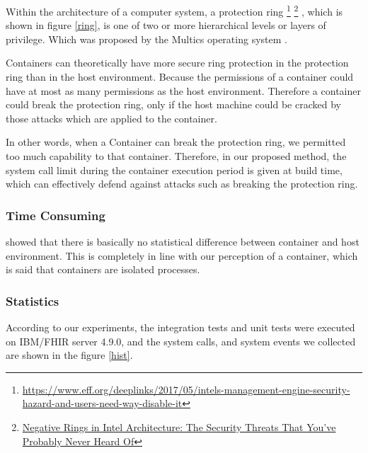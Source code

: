 Within the architecture of a computer system, a protection ring
\footnote{\url{https://www.eff.org/deeplinks/2017/05/intels-management-engine-security-hazard-and-users-need-way-disable-it}}
\footnote{\href{https://medium.com/swlh/negative-rings-in-intel-architecture-the-security-threats-youve-probably-never-heard-of-d725a4b6f831}
{Negative Rings in Intel Architecture: The Security Threats That You’ve Probably Never Heard Of}}
, which is shown in figure \ref{ring}, is one of two or more
hierarchical levels or layers of privilege. Which was proposed by the Multics 
operating system \cite{6234805}.

Containers can theoretically have more secure ring protection in the
protection ring than in the host environment. Because the permissions
of a container could have at most as many permissions as the host environment.
Therefore a container could break the protection ring, only if the host
machine could be cracked by those attacks which are applied to the container.

In other words, when a Container can break the protection ring, we permitted
too much capability to that container. Therefore, in our proposed method, the
system call limit during the container execution period is given at build time,
which can effectively defend against attacks such as breaking the protection ring.

\subsubsection{Time Consuming}
\textcite{KOZHIRBAYEV2017175} showed that there is basically no
statistical difference between container and host environment.
This is completely in line with our perception of a container, 
which is said that containers are isolated processes.

\subsubsection{Statistics}
According to our experiments, the integration tests and unit
tests were executed on IBM/FHIR server 4.9.0, and the system calls,
and system events we collected are shown in the figure \ref{hist}.

